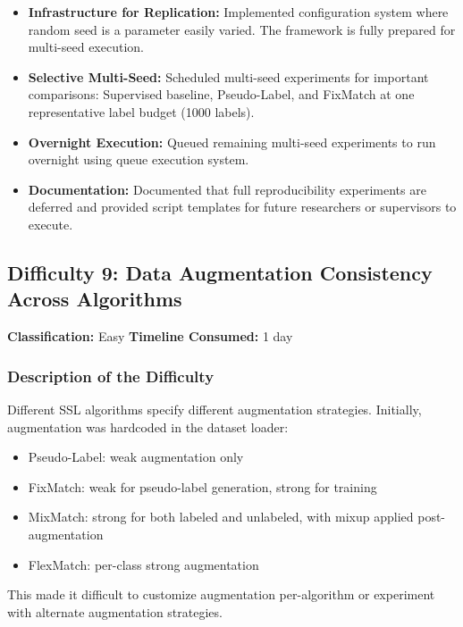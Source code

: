 \begin{itemize}
    \item \textbf{Infrastructure for Replication:} Implemented configuration system where random seed is a parameter easily varied. The framework is fully prepared for multi-seed execution.
    
    \item \textbf{Selective Multi-Seed:} Scheduled multi-seed experiments for important comparisons: Supervised baseline, Pseudo-Label, and FixMatch at one representative label budget (1000 labels).
    
    \item \textbf{Overnight Execution:} Queued remaining multi-seed experiments to run overnight using queue execution system.
    
    \item \textbf{Documentation:} Documented that full reproducibility experiments are deferred and provided script templates for future researchers or supervisors to execute.
\end{itemize}

\subsection{Difficulty 9: Data Augmentation Consistency Across Algorithms}

\textbf{Classification:} Easy \quad \textbf{Timeline Consumed:} 1 day

\subsubsection{Description of the Difficulty}

Different SSL algorithms specify different augmentation strategies. Initially, augmentation was hardcoded in the dataset loader:

\begin{itemize}
    \item Pseudo-Label: weak augmentation only
    \item FixMatch: weak for pseudo-label generation, strong for training
    \item MixMatch: strong for both labeled and unlabeled, with mixup applied post-augmentation
    \item FlexMatch: per-class strong augmentation
\end{itemize}

This made it difficult to customize augmentation per-algorithm or experiment with alternate augmentation strategies.


